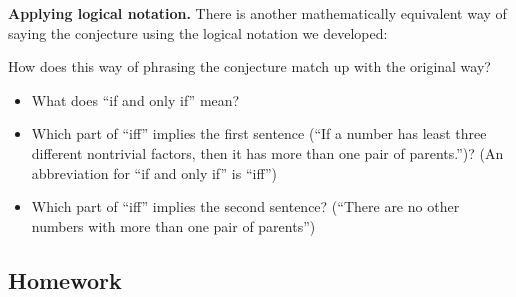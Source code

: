 \documentclass[11pt]{article}
\theoremstyle{definition}
\begin{document}
\vfill

{\bf Applying logical notation.} There is another mathematically equivalent way of saying the conjecture using the logical notation we developed:
\begin{mdframed}
\vspace*{1in}
\end{mdframed}
How does this way of phrasing the conjecture match up with the original way? 
	\begin{itemize}
	\item What does ``if and only if'' mean? 
	\item Which part of ``iff'' implies the first sentence (``If a number has least three different nontrivial factors, then it has more than one pair of parents.'')?   (An abbreviation for ``if and only if'' is ``iff'')
	\item Which part of ``iff'' implies the second sentence? (``There are no other numbers with more than one pair of parents'') 
	\end{itemize}
	
\vfill



\newpage \subsection{Homework}  
\end{document}

